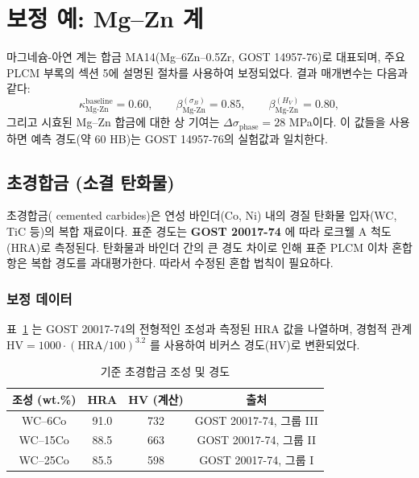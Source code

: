 \documentclass[12pt,a4paper]{article}
\begin{document}
	\section{보정 예: Mg–Zn 계}
	마그네슘-아연 계는 합금 MA14(Mg–6Zn–0.5Zr, GOST 14957-76)로 대표되며, 주요 PLCM 부록의 섹션 5에 설명된 절차를 사용하여 보정되었다. 결과 매개변수는 다음과 같다:
	\[
	\kappa_{\text{Mg-Zn}}^{\text{baseline}} = 0.60,\qquad
	\beta_{\text{Mg-Zn}}^{(\sigma_B)} = 0.85,\qquad
	\beta_{\text{Mg-Zn}}^{(H_V)} = 0.80,
	\]
	그리고 시효된 Mg–Zn 합금에 대한 상 기여는 $\Delta\sigma_{\text{phase}} = 28$ MPa이다. 이 값들을 사용하면 예측 경도(약 60 HB)는 GOST 14957-76의 실험값과 일치한다.
	
	
	\subsection{초경합금 (소결 탄화물)}
	\label{subsec:hardmetals}
	
	초경합금( cemented carbides)은 연성 바인더(Co, Ni) 내의 경질 탄화물 입자(WC, TiC 등)의 복합 재료이다. 표준 경도는 \textbf{GOST 20017-74} 에 따라 로크웰 A 척도(HRA)로 측정된다. 탄화물과 바인더 간의 큰 경도 차이로 인해 표준 PLCM 이차 혼합 항은 복합 경도를 과대평가한다. 따라서 수정된 혼합 법칙이 필요하다.
	
	\subsubsection{보정 데이터}
	표~\ref{tab:hardmetal_compositions} 는 GOST 20017-74의 전형적인 조성과 측정된 HRA 값을 나열하며, 경험적 관계 $\text{HV} = 1000 \cdot (\text{HRA}/100)^{3.2}$ 를 사용하여 비커스 경도(HV)로 변환되었다.
	
	\begin{table}[htbp]
		\centering
		\caption{기준 초경합금 조성 및 경도}
		\label{tab:hardmetal_compositions}
		\begin{tabular}{cccc}
			\toprule
			\textbf{조성 (wt.\%)} & \textbf{HRA} & \textbf{HV (계산)} & \textbf{출처} \\
			\midrule
			WC–6Co & 91.0 & 732 & GOST 20017-74, 그룹 III \\
			WC–15Co & 88.5 & 663 & GOST 20017-74, 그룹 II \\
			WC–25Co & 85.5 & 598 & GOST 20017-74, 그룹 I \\
			\bottomrule
		\end{tabular}
	\end{table}
	
\end{document}
